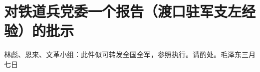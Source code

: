 \section[对铁道兵党委一个报告（渡口驻军支左经验）的批示（一九六七年三月七日）]{对铁道兵党委一个报告（渡口驻军支左经验）的批示}


林彪、恩来、文革小组：此件似可转发全国全军，参照执行。请酌处。毛泽东三月七日


